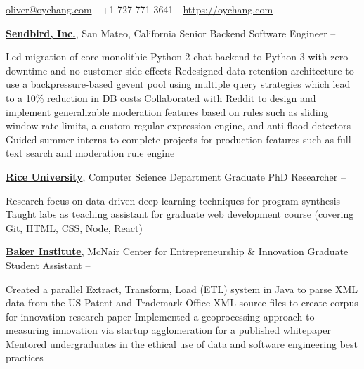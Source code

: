 \documentclass[letterpaper,MMMyyyy,nonstopmode]{simpleresumecv}
\newcommand{\CVAuthor}{Oliver Chang}
\newcommand{\CVWebpage}{https://oychang.com}
\begin{document}

\Title{\CVAuthor}

\begin{SubTitle}
\href{mailto:oliver@oychang.com}{oliver@oychang.com}
\,\SubBulletSymbol\,
+1-727-771-3641
\,\SubBulletSymbol\,
\href{\CVWebpage}
{\url{\CVWebpage}}
\end{SubTitle}

\begin{Body}




\Entry
\href{https://www.sendbird.com/}{\textbf{Sendbird, Inc.}}, San Mateo, California
\Gap
\BulletItem Senior Backend Software Engineer
\hfill {} -- 
\begin{Detail}
\SubBulletItem Led migration of core monolithic Python 2 chat backend to Python 3 with zero downtime and no customer side effects
\SubBulletItem Redesigned data retention architecture to use a backpressure-based gevent pool using multiple query strategies which lead to a 10\% reduction in DB costs
\SubBulletItem Collaborated with Reddit to design and implement generalizable moderation features based on rules such as sliding window rate limits, a custom regular expression engine, and anti-flood detectors
\SubBulletItem Guided summer interns to complete projects for production features such as full-text search and moderation rule engine
\end{Detail}

\Entry
\href{http://www.rice.edu/}{\textbf{Rice University}}, Computer Science Department
\Gap
\BulletItem Graduate PhD Researcher
\hfill {} -- 
\begin{Detail}
\SubBulletItem Research focus on data-driven deep learning techniques for program synthesis
\SubBulletItem Taught labs as teaching assistant for graduate web development course (covering Git, HTML, CSS, Node, React)
\end{Detail}

\Entry
\href{http://www.rice.edu/}{\textbf{Baker Institute}}, McNair Center for Entrepreneurship \& Innovation
\Gap
\BulletItem Graduate Student Assistant
\hfill {} -- 
\begin{Detail}
\SubBulletItem Created a parallel Extract, Transform, Load (ETL) system in Java to parse XML data from the US Patent and Trademark Office XML source files to create corpus for innovation research paper
\SubBulletItem Implemented a geoprocessing approach to measuring innovation via startup agglomeration for a published whitepaper
\SubBulletItem Mentored undergraduates in the ethical use of data and software engineering best practices
\end{Detail}


\end{Body}
\end{document}
